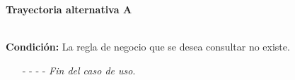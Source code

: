 \hypertarget{CU8-4:TAA}{\textbf{Trayectoria alternativa A}}\\
\noindent \textbf{Condición:} La regla de negocio que se desea consultar no existe.
\begin{enumerate}
	\UCpaso[\UCsist] Muestra el mensaje  en la pantalla .
	\item[- -] - - {\em {Fin del caso de uso}}.
\end{enumerate}
	
